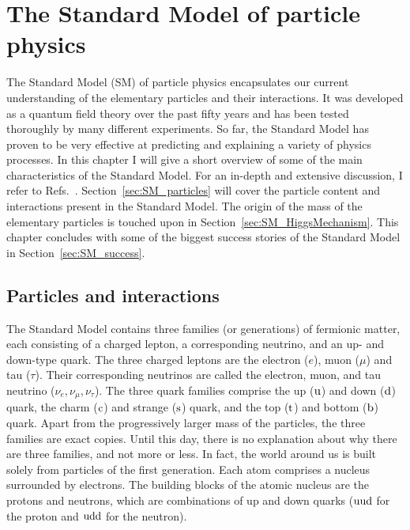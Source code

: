 \chapter{The Standard Model of particle physics \label{chap:standard_model}}

The Standard Model (SM) of particle physics encapsulates our current understanding of the elementary
particles and their interactions. 
It was developed as a quantum field theory over the past fifty years and has been tested thoroughly
by many different experiments. So far, the Standard Model has proven to be very effective at
predicting and explaining a variety of physics processes. 
In this chapter I will give a short overview of some of the main characteristics of the Standard
Model. For an in-depth and extensive discussion, I refer to
Refs.~\cite{Povh:1995mua,bettini2014introduction,Peskin:1995ev,Burgess:2007zi,Agashe:2014kda}.
Section~\ref{sec:SM_particles} will cover the particle content and interactions
present in the Standard Model. The origin of the mass of the elementary particles is touched upon
in Section~\ref{sec:SM_HiggsMechanism}. This chapter concludes with some of the biggest success
stories of the Standard Model in Section~\ref{sec:SM_success}.

\section{Particles and interactions \label{sec:SM_particles}}

The Standard Model contains three families (or generations) of fermionic matter, each consisting of
a charged lepton, a corresponding neutrino, and an up- and down-type quark.
The three charged leptons are the electron ($e$), muon ($\mu$) and tau ($\tau$). Their corresponding
neutrinos are called the electron, muon, and tau neutrino ($\nu_e, \nu_\mu, \nu_\tau$). 
The three quark families comprise the up ($\mathrm{u}$) and down ($\mathrm{d}$) quark, the charm
($\mathrm{c}$) and strange ($\mathrm{s}$) quark, and the top ($\mathrm{t}$) and bottom ($\mathrm{b}$) quark.
Apart from the progressively larger mass of the particles, the three families are exact copies.
Until this day, there is no explanation about why there are three families, and not more or less. 
In fact, the world around us is built solely from particles of the first generation. 
Each atom comprises a nucleus surrounded by electrons. 
The building blocks of the atomic nucleus are the protons and neutrons, which are combinations of up
and down quarks ($\mathrm{u}\mathrm{u}\mathrm{d}$ for the proton and $\mathrm{u}\mathrm{d}\mathrm{d}$ for the neutron).

